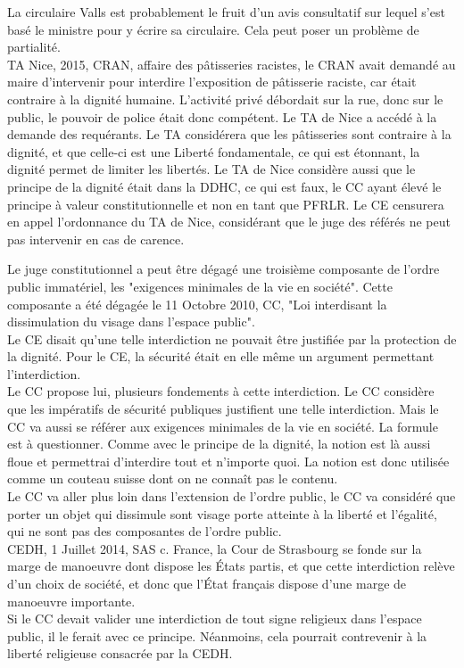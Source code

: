 \documentclass[10pt, a4paper, openany]{book}
\begin{document}
La circulaire Valls est probablement le fruit d'un avis consultatif sur lequel s'est basé le ministre pour y écrire sa circulaire. Cela peut poser un problème de partialité. \\
TA Nice, 2015, CRAN, affaire des pâtisseries racistes, le CRAN avait demandé au maire d'intervenir pour interdire l'exposition de pâtisserie raciste, car était contraire à la dignité humaine. L'activité privé débordait sur la rue, donc sur le public, le pouvoir de police était donc compétent. Le TA de Nice a accédé à la demande des requérants. Le TA considérera que les pâtisseries sont contraire à la dignité, et que celle-ci est une Liberté fondamentale, ce qui est étonnant, la dignité permet de limiter les libertés. Le TA de Nice considère aussi que le principe de la dignité était dans la DDHC, ce qui est faux, le CC ayant élevé le principe à valeur constitutionnelle et non en tant que PFRLR. Le CE censurera en appel l'ordonnance du TA de Nice, considérant que le juge des référés ne peut pas intervenir en cas de carence.  


Le juge constitutionnel a peut être dégagé une troisième composante de l'ordre public immatériel, les "exigences minimales de la vie en société". Cette composante a été dégagée le 11 Octobre 2010, CC, "Loi interdisant la dissimulation du visage dans l'espace public". \\
Le CE disait qu'une telle interdiction ne pouvait être justifiée par la protection de la dignité. Pour le CE, la sécurité était en elle même un argument permettant l'interdiction. \\
Le CC propose lui, plusieurs fondements à cette interdiction. Le CC considère que les impératifs de sécurité publiques justifient une telle interdiction. Mais le CC va aussi se référer aux exigences minimales de la vie en société. La formule est à questionner. Comme avec le principe de la dignité, la notion est là aussi floue et permettrai d'interdire tout et n'importe quoi. La notion est donc utilisée comme un couteau suisse dont on ne connaît pas le contenu. \\
Le CC va aller plus loin dans l'extension de l'ordre public, le CC va considéré que porter un objet qui dissimule sont visage porte atteinte à la liberté et l'égalité, qui ne sont pas des composantes de l'ordre public. \\
CEDH, 1 Juillet 2014, SAS c. France, la Cour de Strasbourg se fonde sur la marge de manoeuvre dont dispose les États partis, et que cette interdiction relève d'un choix de société, et donc que l'État français dispose d'une marge de manoeuvre importante. \\
Si le CC devait valider une interdiction de tout signe religieux dans l'espace public, il le ferait avec ce principe. Néanmoins, cela pourrait contrevenir à la liberté religieuse consacrée par la CEDH.  
\end{document}
